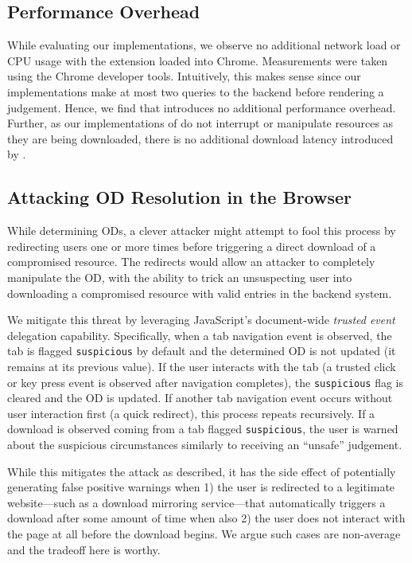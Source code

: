 \subsection{Performance Overhead}

While evaluating our \SYSTEM{} implementations, we observe no additional
network load or CPU usage with the extension loaded into Chrome.
Measurements were taken using the Chrome developer tools. Intuitively, this
makes sense since our \SYSTEM{} implementations make at most two queries to the
backend before rendering a judgement. Hence, we find that \SYSTEM{} introduces
no additional performance overhead. Further, as our implementations
of \SYSTEM{} do not interrupt or manipulate resources as they are being
downloaded, there is no additional download latency introduced by \SYSTEM{}.

\subsection{Attacking OD Resolution in the Browser}

While determining ODs, a clever attacker might attempt to fool this process by
redirecting users one or more times before triggering a direct download of a
compromised resource. The redirects would allow an attacker to completely
manipulate the OD, with the ability to trick an unsuspecting user into
downloading a compromised resource with valid entries in the backend system.

We mitigate this threat by leveraging JavaScript's document-wide \emph{trusted
event}~\cite{TrustedEvents} delegation capability. Specifically, when a tab
navigation event is observed, the tab is flagged \texttt{suspicious} by default
and the determined OD is not updated (\ie it remains at its previous value). If
the user interacts with the tab (\ie a trusted click or key press event is
observed after navigation completes), the \texttt{suspicious} flag is cleared
and the OD is updated. If another tab navigation event occurs without user
interaction first (\eg a quick redirect), this process repeats recursively. If a
download is observed coming from a tab flagged \texttt{suspicious}, the user is
warned about the suspicious circumstances similarly to receiving an ``unsafe''
judgement.

While this mitigates the attack as described, it has the side effect of
potentially generating false positive warnings when 1) the user is redirected to
a legitimate website---such as a download mirroring service---that automatically
triggers a download after some amount of time when also 2) the user does not
interact with the page at all before the download begins. We argue such cases
are non-average and the tradeoff here is worthy.
